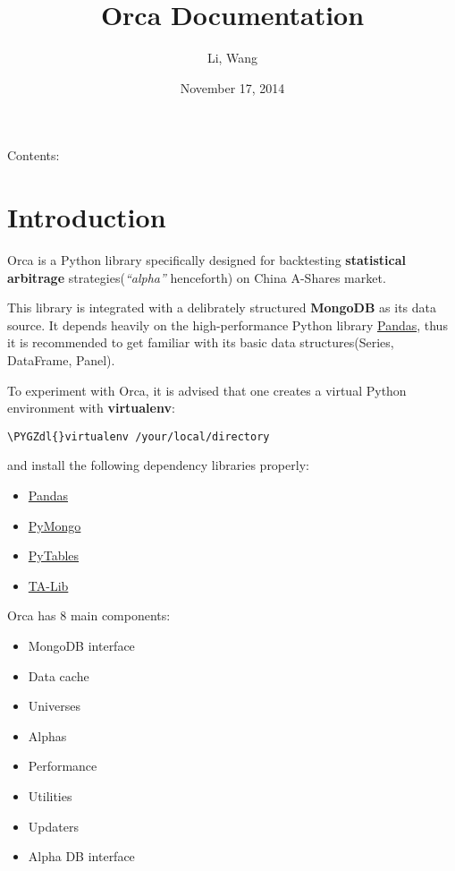 \documentclass[letterpaper,10pt,english]{sphinxmanual}
\title{Orca Documentation}
\date{November 17, 2014}
\author{Li, Wang}
\def\PYGZdl{\char`\$}
\begin{document}
\maketitle
\tableofcontents
{}\label{index::doc}


Contents:


\chapter{Introduction}
\label{intro:introduction}\label{intro:welcome-to-orca-s-documentation}\label{intro::doc}
Orca is a Python library specifically designed for backtesting \textbf{statistical arbitrage} strategies(\emph{``alpha''} henceforth) on China A-Shares market.

This library is integrated with a delibrately structured \textbf{MongoDB} as its data source. It depends heavily on the high-performance Python library \href{http://pandas.pydata.org/}{Pandas}, thus it is recommended to get familiar with its basic data structures(Series, DataFrame, Panel).

To experiment with Orca, it is advised that one creates a virtual Python environment with \textbf{virtualenv}:

\begin{Verbatim}[commandchars=\\\{\}]
\PYGZdl{}virtualenv /your/local/directory
\end{Verbatim}

and install the following dependency libraries properly:
\begin{itemize}
\item {} 
\href{http://pandas.pydata.org/}{Pandas}

\item {} 
\href{http://api.mongodb.org/python/current/}{PyMongo}

\item {} 
\href{http://www.pytables.org/moin/}{PyTables}

\item {} 
\href{https://github.com/mrjbq7/ta-lib}{TA-Lib}

\end{itemize}

Orca has 8 main components:
\begin{itemize}
\item {} 
MongoDB interface

\item {} 
Data cache

\item {} 
Universes

\item {} 
Alphas

\item {} 
Performance

\item {} 
Utilities

\item {} 
Updaters

\item {} 
Alpha DB interface

\end{itemize}
\end{document}
